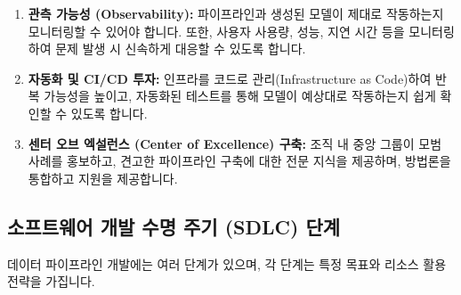 \documentclass[11pt,a4paper]{article}
\begin{document}
\begin{enumerate}
    \item \textbf{관측 가능성 (Observability):}
    파이프라인과 생성된 모델이 제대로 작동하는지 모니터링할 수 있어야 합니다. 또한, 사용자 사용량, 성능, 지연 시간 등을 모니터링하여 문제 발생 시 신속하게 대응할 수 있도록 합니다.

    \item \textbf{자동화 및 CI/CD 투자:}
    인프라를 코드로 관리(Infrastructure as Code)하여 반복 가능성을 높이고, 자동화된 테스트를 통해 모델이 예상대로 작동하는지 쉽게 확인할 수 있도록 합니다.

    \item \textbf{센터 오브 엑설런스 (Center of Excellence) 구축:}
    조직 내 중앙 그룹이 모범 사례를 홍보하고, 견고한 파이프라인 구축에 대한 전문 지식을 제공하며, 방법론을 통합하고 지원을 제공합니다.
\end{enumerate}

\subsection{소프트웨어 개발 수명 주기 (SDLC) 단계}
데이터 파이프라인 개발에는 여러 단계가 있으며, 각 단계는 특정 목표와 리소스 활용 전략을 가집니다.
\end{document}
